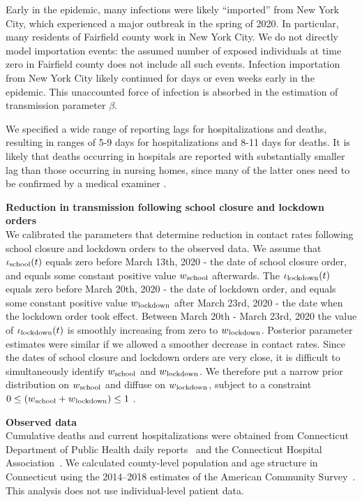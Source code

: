 \documentclass[11pt]{article}
\begin{document}
Early in the epidemic, many infections were likely ``imported'' from New York City, which experienced a major outbreak in the spring of 2020. In particular, many residents of Fairfield county work in New York City. We do not directly model importation events: the assumed number of exposed individuals at time zero in Fairfield county does not include all such events. Infection importation from New York City likely continued for days or even weeks early in the epidemic. This unaccounted force of infection is absorbed in the estimation of transmission parameter $\beta$.

We specified a wide range of reporting lags for hospitalizations and deaths, resulting in ranges of 5-9 days for hospitalizations and 8-11 days for deaths. It is likely that deaths occurring in hospitals are reported with substantially smaller lag than those occurring in nursing homes, since many of the latter ones need to be confirmed by a medical examiner \citep{DPHwebsitenursing}.  

\textbf{Reduction in transmission following school closure and lockdown orders} \\[0.5em]
We calibrated the parameters that determine reduction in contact rates following school closure and lockdown orders to the observed data. 
We assume that $\iota\textsubscript{school}(t)$ equals zero before March 13th, 2020 - the date of school closure order, and equals some constant positive value $w\textsubscript{school}$ afterwards. 
The  $\iota\textsubscript{lockdown} (t)$ equals zero before March 20th, 2020 - the date of lockdown order, and equals some constant positive value $w\textsubscript{lockdown}$ after March 23rd, 2020 - the date when the lockdown order took effect. Between March 20th - March 23rd, 2020 the value of $\iota\textsubscript{lockdown} (t)$ is smoothly increasing from zero to $w\textsubscript{lockdown}$. Posterior parameter estimates were similar if we allowed a smoother decrease in contact rates.
Since the dates of school closure and lockdown orders are very close, it is difficult to simultaneously identify $w\textsubscript{school}$ and $w\textsubscript{lockdown}$. We therefore put a narrow prior distribution on $w\textsubscript{school}$ and diffuse on $w\textsubscript{lockdown}$, subject to a constraint $ 0 \le (w\textsubscript{school} + w\textsubscript{lockdown}) \le 1$ . 


\textbf{Observed data} \\[0.5em]
Cumulative deaths and current hospitalizations were obtained from Connecticut Department of Public Health daily reports~\citep{DPHwebsite} and the Connecticut Hospital Association~\citep{CHAwebsite}. 
We calculated county-level population and age structure in Connecticut using the 2014--2018 estimates of the American Community Survey~\citep{acs2018}. 
This analysis does not use individual-level patient data.
\end{document}
